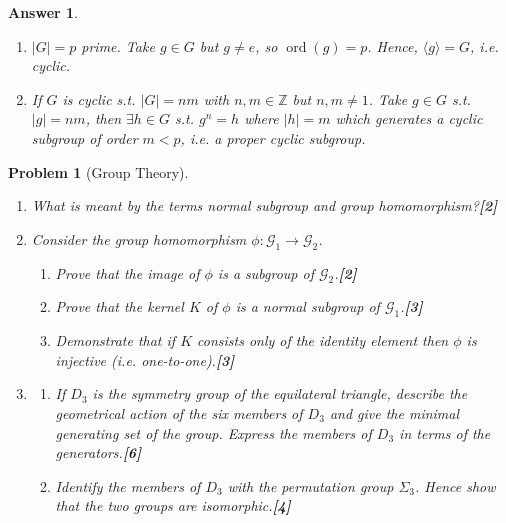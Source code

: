 \documentclass[a4paper]{article}
\DeclareMathOperator{\ord}{ord}
\newtheorem{ans}{Answer}[section]
\theoremstyle{new}
\newtheorem{qns}{Problem}[section]
\begin{document}
\begin{ans}
\begin{enumerate}[label=(\roman*)]
\begin{itemize}
    \item Closure: $g^sg^r=g^{p}$ where $p=(s+r)\text{ mod}k$.
    \item Associativity: inherited;
    \item Identity: the same as that of $G$;
    \item Inverse: $g^{k-r}$ is the inverse of $g^r$.
\end{itemize}
By Lagrange's theorem, $\ord(g)$ divides $|G|$.
\item $|G|=p$ prime. Take $g\in G$ but $g\neq e$, so $\ord(g)=p$. Hence, $\langle g\rangle=G$, i.e. cyclic.
\item If $G$ is cyclic s.t. $|G|=nm$ with $n,m\in\mathbb{Z}$ but $n,m\neq 1$. Take $g\in G$ s.t. $|g|=nm$, then $\exists h\in G$ s.t. $g^n=h$ where $|h|=m$ which generates a cyclic subgroup of order $m<p$, i.e. a proper cyclic subgroup.
\end{enumerate}
\end{ans}
\newpage
\begin{qns}[Group Theory]\leavevmode
\begin{enumerate}[label=(\roman*)]
\item What is meant by the terms normal subgroup and group homomorphism?\hfill\textbf{[2]}
\item Consider the group homomorphism $\phi:\mathcal{G}_1\rightarrow\mathcal{G}_2$.
\begin{enumerate}[label=(\alph*)]
\item Prove that the image of $\phi$ is a subgroup of $\mathcal{G}_2$.\hfill\textbf{[2]}
\item Prove that the kernel $K$ of $\phi$ is a normal subgroup of $\mathcal{G}_1$.\hfill\textbf{[3]}
\item Demonstrate that if $K$ consists only of the identity element then $\phi$ is injective (i.e. one-to-one).\hfill\textbf{[3]}
\end{enumerate}
\item
\begin{enumerate}[label=(\alph*)]
\item If $D_3$ is the symmetry group of the equilateral triangle, describe the geometrical action of the six members of $D_3$ and give the minimal generating set of the group. Express the members of $D_3$ in terms of the generators.\hfill\textbf{[6]}
\item Identify the members of $D_3$ with the permutation group $\Sigma_3$. Hence show that the two groups are isomorphic.\hfill\textbf{[4]}
\end{enumerate}
\end{enumerate}
\end{qns}
\end{document}

